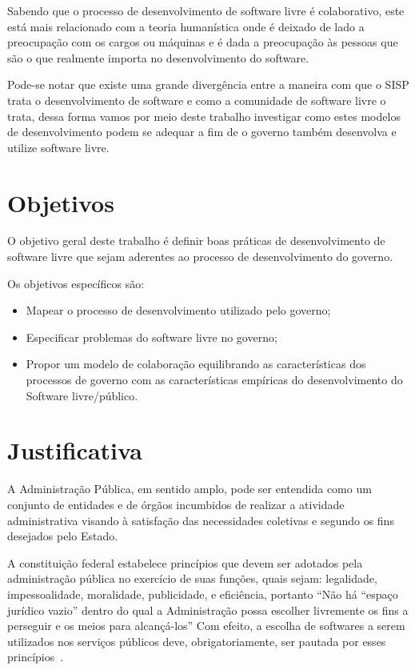 Sabendo que o processo de desenvolvimento de software livre é colaborativo, este 
está mais relacionado com a teoria humanística onde é deixado de lado a preocupação
com os cargos ou máquinas e é dada a preocupação às pessoas que são o que realmente
importa no desenvolvimento do software.

Pode-se notar que existe uma grande divergência entre a maneira com que o SISP trata
o desenvolvimento de software e como a comunidade de software livre o trata, dessa forma vamos
por meio deste trabalho investigar como estes modelos de desenvolvimento podem 
se adequar a fim de o governo também desenvolva e utilize software livre.

\section{Objetivos}

O objetivo geral deste trabalho é definir boas práticas de desenvolvimento de 
software livre que sejam aderentes ao processo de desenvolvimento do governo.

Os objetivos específicos são:

\begin{itemize}
\item Mapear o processo de desenvolvimento utilizado pelo governo;
\item Especificar problemas do software livre no governo;
\item Propor um modelo de colaboração equilibrando as características 
dos processos de governo com as características empíricas do desenvolvimento 
do Software livre/público.
\end{itemize}

\section{Justificativa}

A Administração Pública, em sentido amplo, pode ser entendida como um conjunto 
de entidades e de órgãos incumbidos de realizar a atividade administrativa visando 
à satisfação das necessidades coletivas e segundo os fins desejados pelo Estado.
\cite{coutinho2012uso}

A constituição federal estabelece princípios que devem ser adotados pela administração pública
no exercício de suas funções, quais sejam: legalidade, impessoalidade, moralidade, publicidade, e
eficiência, portanto “Não há “espaço jurídico vazio” dentro do qual a Administração possa escolher
livremente os fins a perseguir e os meios para alcançá-los” 
%
Com efeito, a escolha de softwares a serem utilizados nos serviços públicos deve, obrigatoriamente,
ser pautada por esses princípios~\cite{coutinho2012uso}.

